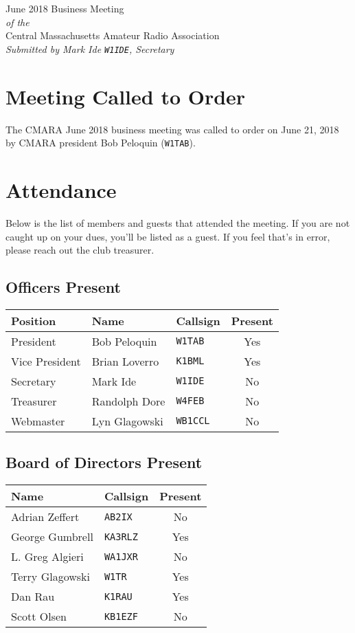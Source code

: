 \documentclass[10pt,letterpaper]{article}
\begin{document}
\begin{center}
{\huge June 2018 Business Meeting}\\
\emph{of the}\\
{\Large Central Massachusetts Amateur Radio Association}\\
\emph{Submitted by Mark Ide \texttt{W1IDE}, Secretary}
\end{center}

\section{Meeting Called to Order}
The CMARA June 2018 business meeting was called to order on June 21, 2018 by CMARA president Bob Peloquin (\texttt{W1TAB}).

\section{Attendance}
\noindent
Below is the list of members and guests that attended the meeting. If you are not caught up on your dues, you'll be listed as a guest. If you feel that's in error, please reach out the club treasurer.

\subsection{Officers Present}
\begin{tabular}{|l|l|l|c|}
  \hline
  \textbf{Position} & \textbf{Name}  & \textbf{Callsign} & \textbf{Present} \\ \hline
  President         & Bob Peloquin   & \texttt{W1TAB}    & Yes \\
  Vice President    & Brian Loverro  & \texttt{K1BML}    & Yes \\
  Secretary         & Mark Ide       & \texttt{W1IDE}    & No  \\
  Treasurer         & Randolph Dore  & \texttt{W4FEB}    & No  \\
  Webmaster         & Lyn Glagowski  & \texttt{WB1CCL}   & No  \\
  \hline
\end{tabular}

\subsection{Board of Directors Present}
\begin{tabular}{|l|l|c|}
  \hline
  \textbf{Name}     & \textbf{Callsign} & \textbf{Present} \\ \hline
  Adrian Zeffert  & \texttt{AB2IX}    & No  \\
  George Gumbrell & \texttt{KA3RLZ}   & Yes \\
  L. Greg Algieri & \texttt{WA1JXR}   & No  \\
  Terry Glagowski & \texttt{W1TR}     & Yes \\
  Dan Rau         & \texttt{K1RAU}    & Yes \\
  Scott Olsen     & \texttt{KB1EZF}   & No  \\
  \hline
\end{tabular}
\end{document}
